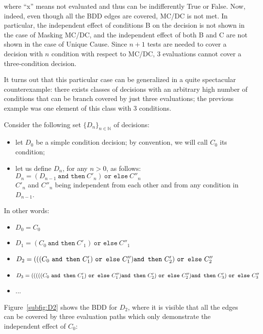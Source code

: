 \documentclass[a4paper,12pt,twoside]{article}
\newcommand{\N}{\mathbb{N}}
\newcommand{\andthen}{\texttt{and then}}
\newcommand{\orelse}{\texttt{or else}}
\begin{document}
where ``x'' means not evaluated and thus can be indifferently True or False.
%
Now, indeed, even though all the BDD edges are covered, MC/DC is not
met. In particular, the independent effect of conditions B on the
decision is not shown in the case of Masking MC/DC, and the
independent effect of both B and C are not shown in the case of Unique
Cause.  Since $n+1$ tests are needed to cover a decision with $n$
condition with respect to MC/DC, 3 evaluations cannot cover a
three-condition decision.

It turns out that this particular case can be generalized in a
quite spectacular counterexample: there exists classes of decisions
with an arbitrary high number of conditions that can be branch covered
by just three evaluations; the previous example was one element of this
class with 3 conditions.

Consider the following set $\{D_{n}\}_{n \in \N}$  of decisions:

\begin{itemize}
\item let $D_{0}$ be a simple condition decision; by convention,
      we will call $C_{0}$ its condition;
\item let us define $D_{n}$, for any $n>0$, as follows:\\
      $D_{n} = (D_{n-1} \ \andthen{} \ C'_{n}) \ \orelse{} \ C''_{n}$\\
      $C'_{n}$ and $C''_{n}$ being independent from each other and from
      any condition in $D_{n-1}$.
\end{itemize}

In other words:
\begin{itemize}
\item $D_{0} = C_{0}$
\item $D_{1} = (C_{0} \ \andthen{} \ C'_{1}) \ \orelse{} \ C''_{1}$
\item $D_{2} = (((C_{0} \ \andthen{} \ C'_{1}) \ \orelse{} \ C''_{1})\\
                 \andthen{} \ C'_{2}) \ \orelse{} \ C''_{2}$
\item $D_{3} = (((((C_{0} \ \andthen{} \ C'_{1}) \ \orelse{} \ C''_{1})\\
                 \andthen{} \ C'_{2}) \ \orelse{} \ C''_{2})\\
                   \andthen{} \ C'_{3}) \ \orelse{} \ C''_{3}$
\item ...
\end{itemize}

Figure~\ref{subfig:D2} shows the BDD for $D_{2}$, where it is visible
that all the edges can be covered by three evaluation paths which only
demonstrate the independent effect of $C_{0}$:
\end{document}
